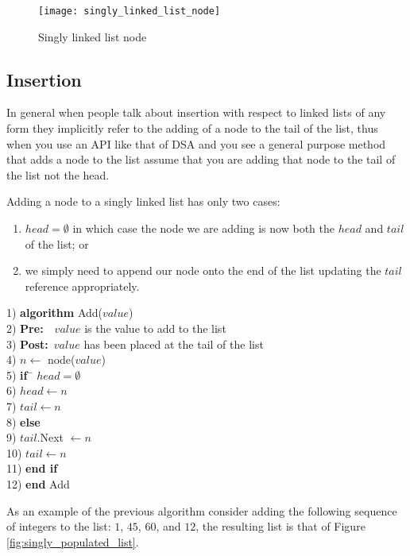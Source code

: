 \begin{figure}
\begin{center}
\texttt{[image: singly\_linked\_list\_node]}
\end{center}
\caption{Singly linked list node}
\end{figure}

\subsection{Insertion} \label{single_insertion}
In general when people talk about insertion with respect to linked lists of any form they implicitly refer to the adding of a node to the tail of the list, thus when you use an API like that of DSA and you see a general purpose method that adds a node to the list assume that you are adding that node to the tail of the list not the head.

Adding a node to a singly linked list has only two cases: 
\begin{enumerate}
\item $head = \emptyset$ in which case the node we are adding is now both the $head$ and $tail$ of the list; or
\item we simply need to append our node onto the end of the list updating the $tail$ reference appropriately.
\end{enumerate}

\begin{tabbing}
1)  \textbf{alg}\= \textbf{orithm} Add($value$) \\
2)  \> \textbf{Pre:}~~$value$ is the value to add to the list \\
3)  \> \textbf{Post:}~$value$ has been placed at the tail of the list \\
4)  \> $n \leftarrow$ node($value$) \\
5)  \> \textbf{if}~\= $head = \emptyset$ \\
6)  \> \> $head \leftarrow n$ \\
7)  \> \> $tail \leftarrow n$ \\
8)  \> \textbf{else} \\
9)  \> \> $tail$.Next $\leftarrow n$ \\
10) \> \> $tail \leftarrow n$ \\
11) \> \textbf{end if} \\
12) \textbf{end} Add \\
\end{tabbing}

As an example of the previous algorithm consider adding the following sequence of integers to the list: $1$, $45$, $60$, and $12$, the resulting list is that of Figure \ref{fig:singly_populated_list}.

